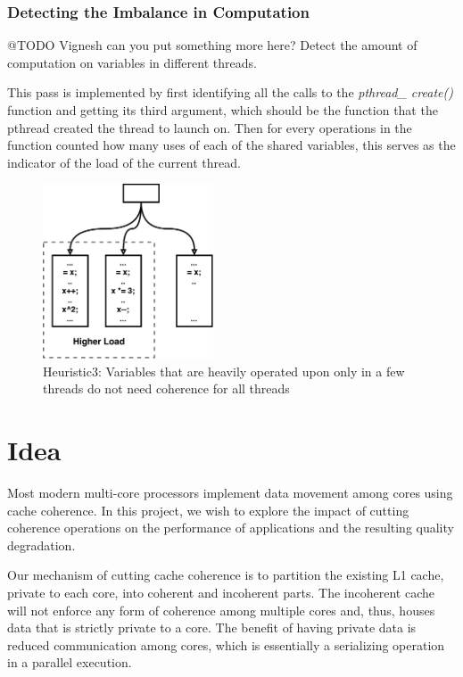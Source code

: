 \documentclass[12pt,conference]{IEEEtran}
\begin{document}
\subsubsection{Detecting the Imbalance in Computation}
@TODO Vignesh can you put something more here?
Detect the amount of computation on variables in different threads.

This pass is implemented by first identifying all the calls to the 
\textit{pthread\_ create()} function and getting its third argument, which should
be the function that the pthread created the thread to launch on. Then for every
operations in the function counted how many uses of each of the shared 
variables, this serves as the indicator of the load of the current thread.

\begin{figure}[h]
    \centering
    \includegraphics[width=0.45\textwidth]{Heuristic3.pdf}
    \caption{Heuristic3: Variables that are heavily operated upon only in a few threads do not need coherence for all threads}
    \label{fig:h3}
\end{figure}

\section{Idea}

Most modern multi-core processors implement data movement among cores
using cache coherence. In this project, we wish to explore the impact 
of cutting
coherence operations on the performance of applications and the 
resulting quality degradation. 

Our mechanism of cutting cache coherence is to partition the
existing L1 cache, private to each core, into coherent and 
incoherent parts. The incoherent cache will not
enforce any form of coherence among multiple cores and, thus,
houses data that is strictly private to a core. The benefit of having private
data is reduced communication among cores, which is essentially a 
serializing operation in a parallel execution. 
\end{document}
